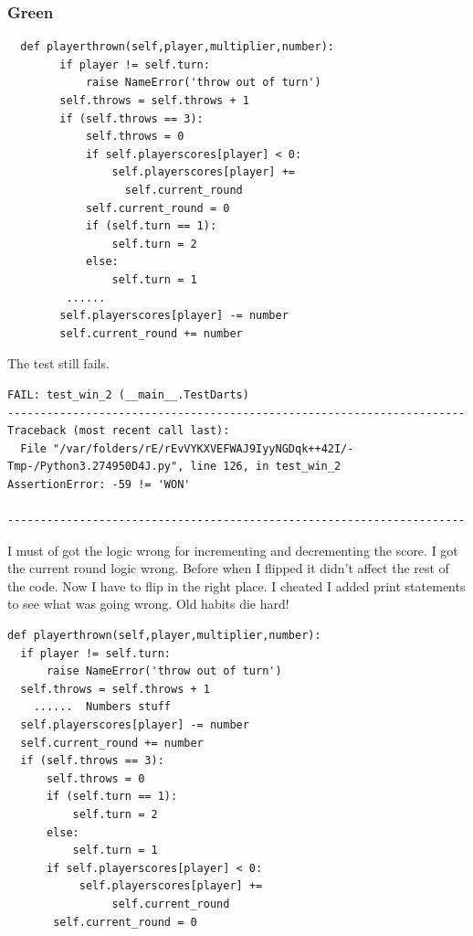 \documentclass{beamer}
\begin{document}
\begin{frame}[fragile]
\frametitle{Green}
\begin{lstlisting}
  def playerthrown(self,player,multiplier,number):
        if player != self.turn:
            raise NameError('throw out of turn')
        self.throws = self.throws + 1
        if (self.throws == 3):
            self.throws = 0
            if self.playerscores[player] < 0:
                self.playerscores[player] += 
                  self.current_round                
            self.current_round = 0
            if (self.turn == 1):
                self.turn = 2
            else:
                self.turn = 1
         ...... 
        self.playerscores[player] -= number
        self.current_round += number
\end{lstlisting}
  
\end{frame}
\begin{frame}[fragile]
The test still fails.
\begin{verbatim}
FAIL: test_win_2 (__main__.TestDarts)
----------------------------------------------------------------------
Traceback (most recent call last):
  File "/var/folders/rE/rEvVYKXVEFWAJ9IyyNGDqk++42I/-Tmp-/Python3.274950D4J.py", line 126, in test_win_2
AssertionError: -59 != 'WON'

----------------------------------------------------------------------
\end{verbatim}
  
 I must of got the logic wrong for incrementing and decrementing the
score. I got the current round logic wrong. Before when I flipped it didn't
affect the rest of the code. Now I have to flip in the right place.
I cheated I added print statements to see what was going wrong. Old
habits die hard!
\end{frame}
\begin{frame}[fragile]
\begin{lstlisting}
def playerthrown(self,player,multiplier,number):
  if player != self.turn:
      raise NameError('throw out of turn')
  self.throws = self.throws + 1
    ......  Numbers stuff
  self.playerscores[player] -= number
  self.current_round += number
  if (self.throws == 3):
      self.throws = 0
      if (self.turn == 1):
          self.turn = 2
      else:
          self.turn = 1
      if self.playerscores[player] < 0:
           self.playerscores[player] +=
                self.current_round
       self.current_round = 0
\end{lstlisting}
\end{frame}
\end{document}
